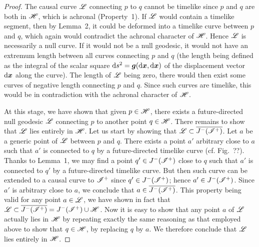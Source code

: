 \begin{proof}
The causal curve $\mathscr{L}$ connecting $p$ to $q$ cannot be timelike since
$p$ and $q$ are both in $\mathscr{H}$, which is achronal (Property~1).
If $\mathscr{L}$ would contain a timelike segment, then by Lemma~2, it could
be deformed into a timelike curve between $p$ and $q$, which again would
contradict the achronal character of $\mathscr{H}$. Hence $\mathscr{L}$ is necessarily a null
curve. If it would not be a null geodesic, it would not have an extremum length
between all curves connecting $p$ and $q$ (the length being defined as
the integral of the scalar square $\mathrm{d} s^2 = \bm{g}(\mathrm{d}\bm{x}, \mathrm{d}\bm{x})$
of the displacement vector $\mathrm{d}\bm{x}$ along the curve).
The length of $\mathscr{L}$ being zero, there would then exist some curves of negative
length connecting $p$ and $q$. Since such curves are timelike, this
would be in contradiction with the achronal character of $\mathscr{H}$.

At this stage, we have shown that given $p\in\mathscr{H}$, there exists
a future-directed null geodesic $\mathscr{L}$ connecting $p$ to another point $q\in\mathscr{H}$.
There remains to show that $\mathscr{L}$ lies entirely in $\mathscr{H}$.
Let us start by showing that $\mathscr{L}\subset \overline{J^-(\mathscr{I}^+)}$.
Let $a$ be a generic point of $\mathscr{L}$ between $p$ and $q$. There exists a point
$a'$ arbitrary close to $a$ such that $a'$ is connected to $q$ by a
future-directed timelike curve (cf. Fig.~??). Thanks to Lemma~1, we may
find a point $q'\in J^-(\mathscr{I}^+)$ close to $q$ such that $a'$ is connected
to $q'$ by a future-directed timelike curve. But then such curve can be extended
to a causal curve to $\mathscr{I}^+$ since $q'\in J^-(\mathscr{I}^+)$; hence
$a'\in  J^-(\mathscr{I}^+)$. Since $a'$ is arbitrary close to $a$, we conclude
that $a\in\overline{J^-(\mathscr{I}^+)}$.
This property being valid for any point $a\in \mathscr{L}$, we have
shown in fact that $\mathscr{L}\subset \overline{J^-(\mathscr{I}^+)} = J^-(\mathscr{I}^+)\cup \mathscr{H}$.
Now it is easy to show that any point $a$ of $\mathscr{L}$ actually lies in $\mathscr{H}$
by repeating exactly the same reasoning as that employed above to show that
$q\in\mathscr{H}$, by replacing $q$ by $a$. We therefore conclude that
$\mathscr{L}$ lies entirely in $\mathscr{H}$.


\end{proof}
